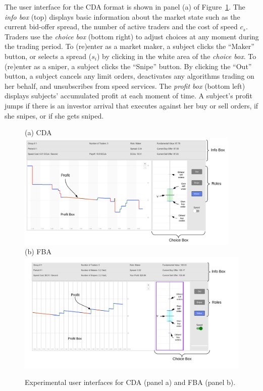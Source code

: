 \documentclass[12pt]{article}
\begin{document}
The user interface for the CDA format is shown in panel (a) of Figure~\ref{fig:UI-CDA}. The \textit{info box} (top) displays basic information about the market state such as the current bid-offer spread, the number of active traders and the cost of speed $c_s$. Traders use the \textit{choice box} (bottom right) to adjust choices at any moment during the trading period. To (re)enter as a market maker, a subject clicks the “Maker” button, or selects a spread ($s_i$) by clicking in the white area of the \textit{choice box}. To (re)enter as a sniper, a subject clicks the “Snipe” button. By clicking the “Out” button, a subject cancels any limit orders, deactivates any algorithms trading on her behalf, and unsubscribes from speed services. The \textit{profit box} (bottom left) displays subjects’ accumulated profit at each moment of time. A subject’s profit jumps if there is an investor arrival that executes against her buy or sell orders, if she snipes, or if she gets sniped. 

\begin{figure}
\centering
(a) CDA \\
\includegraphics[width=0.95\textwidth]{img/UI-CDA_with_labels.png} \\
(b) FBA \\
\includegraphics[width=\textwidth]{img/UI-FBA.png}
\caption{Experimental user interfaces for CDA (panel a) and FBA (panel b). \label{fig:UI-CDA}}
\end{figure}
\end{document}
